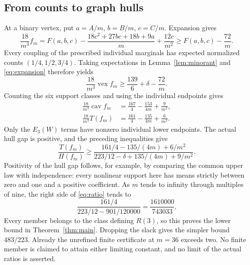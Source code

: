 \documentclass[11pt]{article}
\theoremstyle{remark}
\DeclareMathOperator{\vex}{vex}
\DeclareMathOperator{\cav}{cav}
\begin{document}
\subsection{From counts to graph hulls}
At a binary vertex, put $a=A/m$, $b=B/m$, $c=C/m$. Expansion gives
\begin{equation}\label{eq:expansion}
 \frac{18}{m^3}f_m
 =F(a,b,c)-\frac{18c^2+27bc+18b+9a}{m}+\frac{12c}{m^2}
 \ge F(a,b,c)-\frac{72}{m}.
\end{equation}
Every coupling of the prescribed individual marginals has expected
normalized counts $(1/4,1/2,3/4)$. Taking expectations in
Lemma~\ref{lem:minorant} and \eqref{eq:expansion} therefore yields
\[
 \frac{18}{m^3}\vex f_m\ge\frac{139}{6}+\delta-\frac{72}{m}.
\]
Counting the six support classes and using the individual endpoints gives
\begin{align*}
 \frac{18}{m^3}\cav f_m&=\frac{167}{4}-\frac{153}{4m}+\frac9{m^2},\\
 \frac{18}{m^3}T(f_m)&=\frac{161}{4}-\frac{135}{4m}+\frac6{m^2}.
\end{align*}
Only the $E_3(W)$ terms have nonzero individual lower endpoints.
The actual hull gap is positive, and the preceding inequalities give
\begin{equation}\label{eq:ratio}
 \frac{T(f_m)}{H(f_m)}\ge
 \frac{161/4-135/(4m)+6/m^2}
 {223/12-\delta+135/(4m)+9/m^2}.
\end{equation}
Positivity of the hull gap follows, for example, by comparing the common
upper law with independence: every nonlinear support here has means
strictly between zero and one and a positive coefficient.
As $m$ tends to infinity through multiples of nine, the right side of
\eqref{eq:ratio} tends to
\[
 \frac{161/4}{223/12-901/120000}=\frac{1610000}{743033}.
\]
Every member belongs to the class defining $R(3)$, so this proves the
lower bound in Theorem~\ref{thm:main}. Dropping the slack gives the
simpler bound $483/223$. Already the unrefined finite certificate at
$m=36$ exceeds two. No finite member is claimed to attain either
limiting constant, and no limit of the actual ratios is asserted.
\end{document}
